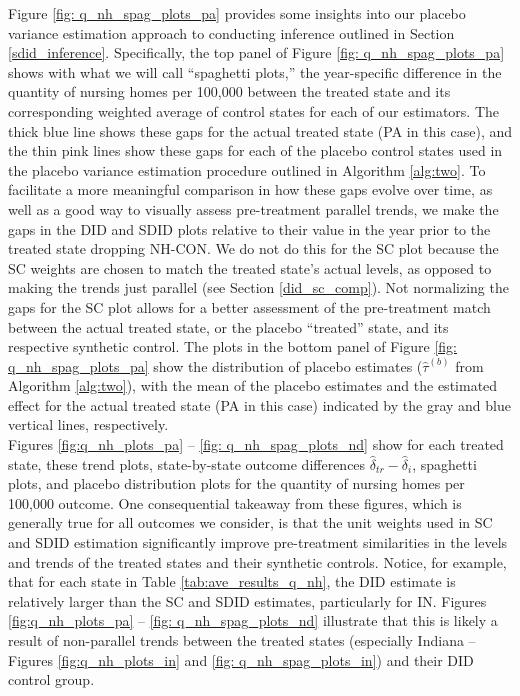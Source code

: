 \documentclass[../Main.tex]{subfiles}
\begin{document}
\indent Figure \ref{fig: q_nh_spag_plots_pa} provides some insights into our placebo variance estimation approach to conducting inference outlined in Section \ref{sdid_inference}. Specifically, the top panel of Figure \ref{fig: q_nh_spag_plots_pa} shows with what we will call ``spaghetti plots,'' the year-specific difference in the quantity of nursing homes per 100,000 between the treated state and its corresponding weighted average of control states for each of our estimators. The thick blue line shows these gaps for the actual treated state (PA in this case), and the thin pink lines show these gaps for each of the placebo control states used in the placebo variance estimation procedure outlined in Algorithm \ref{alg:two}. To facilitate a more meaningful comparison in how these gaps evolve over time, as well as a good way to visually assess pre-treatment parallel trends, we make the gaps in the DID and SDID plots relative to their value in the year prior to the treated state dropping NH-CON. We do not do this for the SC plot because the SC weights are chosen to match the treated state's actual levels, as opposed to making the trends just parallel (see Section \ref{did_sc_comp}). Not normalizing the gaps for the SC plot allows for a better assessment of the pre-treatment match between the actual treated state, or the placebo ``treated'' state, and its respective synthetic control. The plots in the bottom panel of Figure \ref{fig: q_nh_spag_plots_pa} show the distribution of placebo estimates ($\hat{\tau}^{(b)}$ from Algorithm \ref{alg:two}), with the mean of the placebo estimates and the estimated effect for the actual treated state (PA in this case) indicated by the gray and blue vertical lines, respectively.\\  
\indent Figures \ref{fig:q_nh_plots_pa} -- \ref{fig: q_nh_spag_plots_nd} show for each treated state, these trend plots, state-by-state outcome differences $\hat{\delta}_{tr}-\hat{\delta}_i$, spaghetti plots, and placebo distribution plots for the quantity of nursing homes per 100,000 outcome. One consequential takeaway from these figures, which is generally true for all outcomes we consider, is that the unit weights used in SC and SDID estimation significantly improve pre-treatment similarities in the levels and trends of the treated states and their synthetic controls. Notice, for example, that for each state in Table \ref{tab:ave_results_q_nh}, the DID estimate is relatively larger than the SC and SDID estimates, particularly for IN. Figures \ref{fig:q_nh_plots_pa} -- \ref{fig: q_nh_spag_plots_nd} illustrate that this is likely a result of non-parallel trends between the treated states (especially Indiana -- Figures \ref{fig:q_nh_plots_in} and \ref{fig: q_nh_spag_plots_in}) and their DID control group.\\
\end{document}
